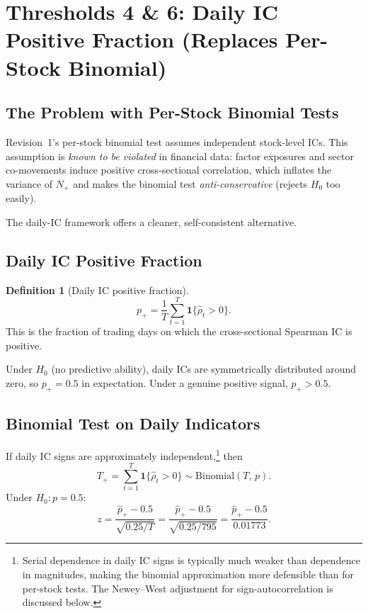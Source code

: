 \documentclass[11pt,a4paper]{article}
\theoremstyle{definition}
\newtheorem{definition}{Definition}[section]
\newcommand{\Ho}{H_{0}}
\begin{document}
\section{Thresholds 4 \& 6: Daily IC Positive Fraction (Replaces Per-Stock Binomial)}
\label{sec:thresh4_6}

\subsection{The Problem with Per-Stock Binomial Tests}

Revision~1's per-stock binomial test assumes independent stock-level
ICs. This assumption is \emph{known to be violated} in financial data:
factor exposures and sector co-movements induce positive cross-sectional
correlation, which inflates the variance of $N_{+}$ and makes the
binomial test \emph{anti-conservative} (rejects $\Ho$ too easily).

The daily-IC framework offers a cleaner, self-consistent alternative.

\subsection{Daily IC Positive Fraction}

\begin{definition}[Daily IC positive fraction]
\label{def:p_plus}
\begin{equation}
    p_{+} = \frac{1}{T}\sum_{t=1}^{T} \mathbf{1}\{\hat{\rho}_{t} > 0\}.
\end{equation}
This is the fraction of trading days on which the cross-sectional
Spearman IC is positive.
\end{definition}

Under $\Ho$ (no predictive ability), daily ICs are symmetrically
distributed around zero, so $p_{+} = 0.5$ in expectation. Under a
genuine positive signal, $p_{+} > 0.5$.

\subsection{Binomial Test on Daily Indicators}

If daily IC signs are approximately independent,\footnote{Serial
dependence in daily IC signs is typically much weaker than dependence
in magnitudes, making the binomial approximation more defensible than
for per-stock tests. The Newey--West adjustment for sign-autocorrelation
is discussed below.} then
\begin{equation}
    T_{+} = \sum_{t=1}^{T} \mathbf{1}\{\hat{\rho}_{t} > 0\}
          \sim \text{Binomial}(T,\,p).
    \label{eq:binomial_daily}
\end{equation}
Under $\Ho: p = 0.5$:
\begin{equation}
    z = \frac{\hat{p}_{+} - 0.5}{\sqrt{0.25/T}}
      = \frac{\hat{p}_{+} - 0.5}{\sqrt{0.25/795}}
      = \frac{\hat{p}_{+} - 0.5}{0.01773}.
    \label{eq:z_daily}
\end{equation}
\end{document}
